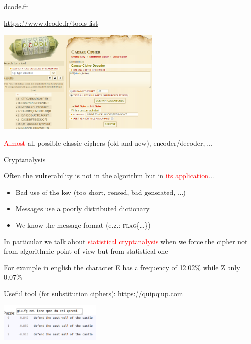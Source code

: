 \begin{frame}{dcode.fr}

\centering

\href{https://www.dcode.fr/tools-list}{https://www.dcode.fr/tools-list}

\medskip

\includegraphics[width=8cm]{img/dcode.png}

\medskip

\textcolor{red}{Almost} all possible classic ciphers (old and new), encoder/decoder, ...

\end{frame}
\begin{frame}{Cryptanalysis}

Often the vulnerability is not in the algorithm but in \textcolor{red}{its application}...

\begin{itemize}
  \item Bad use of the key (too short, reused, bad generated, ...)
  \item Messages use a poorly distributed dictionary
  \item We know the message format (e.g.: \textsc{flag\{\ldots\}})
\end{itemize}

\medskip

In particular we talk about \textcolor{red}{statistical cryptanalysis} when we force the cipher not from algorithmic point of view but from statistical one

\medskip

For example in english the character E has a frequency of 12.02\% while Z only 0.07\%

\medskip

Useful tool (for substitution ciphers): \href{https://quipqiup.com}{https://quipqiup.com}

\medskip

\centering\includegraphics[width=5cm]{img/quipqiup.png}
  
\end{frame}


